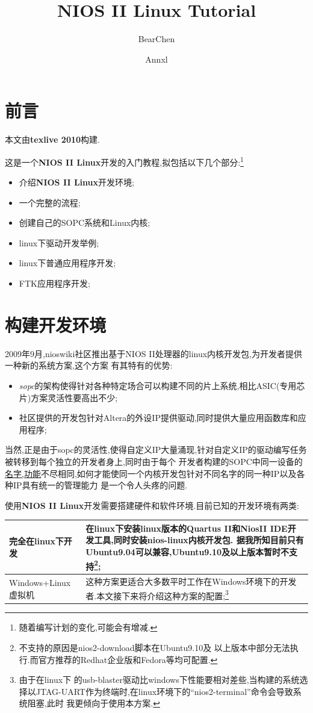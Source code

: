 \documentclass[12pt,a4paper]{article}
\title{NIOS II Linux Tutorial}
\author{BearChen \and Annxl}
\begin{document}
\maketitle{}
\newpage{}
\section{前言}
本文由\textbf{texlive 2010}构建.

这是一个\textbf{NIOS II Linux}开发的入门教程,拟包括以下几个部分:\footnote{随着编写计划的变化,可能会有增减.}
\begin{itemize}
\item 介绍\textbf{NIOS II Linux}开发环境;
\item 一个完整的流程;
\item 创建自己的SOPC系统和Linux内核;
\item linux下驱动开发举例;
\item linux下普通应用程序开发;
\item FTK应用程序开发;
\end{itemize}
\newpage{}
\section{构建开发环境}
2009年9月,nioswiki社区推出基于NIOS II处理器的linux内核开发包,为开发者提供一种新的系统方案,这个方案
有其特有的优势:
\begin{itemize}
\item \textit{sopc}的架构使得针对各种特定场合可以构建不同的片上系统,相比ASIC(专用芯片)方案灵活性要高出不少;
\item 社区提供的开发包针对Altera的外设IP提供驱动,同时提供大量应用函数库和应用程序;
\end{itemize}

当然,正是由于sopc的灵活性,使得自定义IP大量涌现,针对自定义IP的驱动编写任务被转移到每个独立的开发者身上,同时由于每个
开发者构建的SOPC中同一设备的\underline{名字,功能}不尽相同,如何才能使同一个内核开发包针对不同名字的同一种IP以及各种IP具有统一的管理能力
是一个令人头疼的问题.

使用\textbf{NIOS II Linux}开发需要搭建硬件和软件环境.目前已知的开发环境有两类:
\begin{table}[!hbtp]
\centering
\begin{tabular}{|l|p{}|}
\hline
完全在linux下开发 & 在linux下安装linux版本的Quartus II和NiosII IDE开发工具,同时安装nios-linux内核开发包.
据我所知目前只有\textbf{Ubuntu9.04}可以兼容,Ubuntu9.10及以上版本暂时不支持\footnote{不支持的原因是nios2-download脚本在Ubuntu9.10及
以上版本中部分无法执行.而官方推荐的Redhat企业版和Fedora等均可配置.};\\
\hline
Windows+Linux虚拟机 & 这种方案更适合大多数平时工作在Windows环境下的开发者.本文接下来将介绍这种方案的配置;\footnote{由于在linux下
的usb-blaster驱动比windows下性能要相对差些,当构建的系统选择以JTAG-UART作为终端时,在linux环境下的``nios2-terminal''命令会导致系统阻塞,此时
我更倾向于使用本方案.} \\
\hline
\end{tabular}
\end{table}
\end{document}
